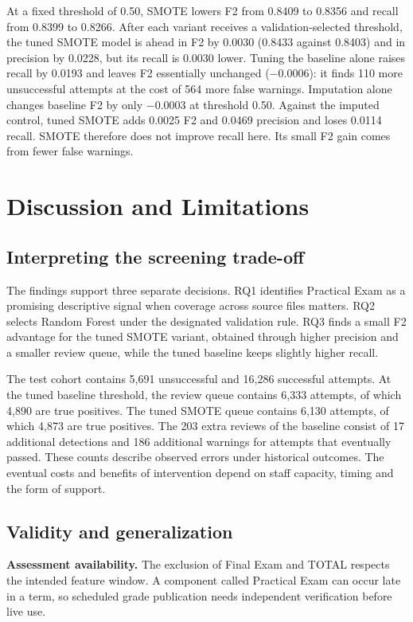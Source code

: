\documentclass[runningheads]{llncs}
\begin{document}
At a fixed threshold of 0.50, SMOTE lowers F2 from 0.8409 to 0.8356 and recall from 0.8399 to 0.8266. After each variant receives a validation-selected threshold, the tuned SMOTE model is ahead in F2 by 0.0030 (0.8433 against 0.8403) and in precision by 0.0228, but its recall is 0.0030 lower. Tuning the baseline alone raises recall by 0.0193 and leaves F2 essentially unchanged ($-0.0006$): it finds 110 more unsuccessful attempts at the cost of 564 more false warnings. Imputation alone changes baseline F2 by only $-0.0003$ at threshold 0.50. Against the imputed control, tuned SMOTE adds 0.0025 F2 and 0.0469 precision and loses 0.0114 recall. SMOTE therefore does not improve recall here. Its small F2 gain comes from fewer false warnings.

\section{Discussion and Limitations}
\subsection{Interpreting the screening trade-off}
The findings support three separate decisions. RQ1 identifies Practical Exam as a promising descriptive signal when coverage across source files matters. RQ2 selects Random Forest under the designated validation rule. RQ3 finds a small F2 advantage for the tuned SMOTE variant, obtained through higher precision and a smaller review queue, while the tuned baseline keeps slightly higher recall.

The test cohort contains 5,691 unsuccessful and 16,286 successful attempts. At the tuned baseline threshold, the review queue contains 6,333 attempts, of which 4,890 are true positives. The tuned SMOTE queue contains 6,130 attempts, of which 4,873 are true positives. The 203 extra reviews of the baseline consist of 17 additional detections and 186 additional warnings for attempts that eventually passed. These counts describe observed errors under historical outcomes. The eventual costs and benefits of intervention depend on staff capacity, timing and the form of support.

\subsection{Validity and generalization}
\textbf{Assessment availability.} The exclusion of Final Exam and TOTAL respects the intended feature window. A component called Practical Exam can occur late in a term, so scheduled grade publication needs independent verification before live use.
\end{document}
